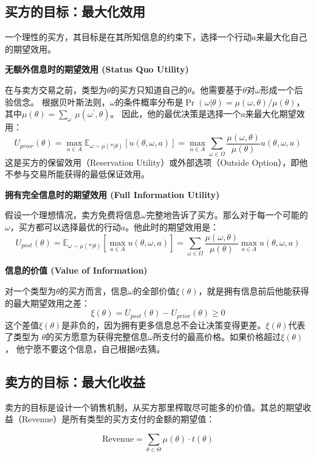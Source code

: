 \subsection{买方的目标：最大化效用}

一个理性的买方，其目标是在其所知信息的约束下，选择一个行动$a$来最大化自己的期望效用。

\textbf{无额外信息时的期望效用 (Status Quo Utility)}

在与卖方交易之前，类型为$\theta$的买方只知道自己的$\theta$。他需要基于$\theta$对$\omega$形成一个后验信念。
根据贝叶斯法则，$\omega$的条件概率分布是$\Pr(\omega | \theta) = \mu(\omega,\theta)/\mu(\theta)$，其中$\mu(\theta)=\sum\limits_{\omega^\prime} \mu(\omega^\prime, \theta)$。
因此，他的最优决策是选择一个$a$来最大化期望效用：
$$U_{prior}(\theta) = \max_{a\in A}\mathbb{E}_{\omega\sim \mu(*|\theta)}[u(\theta,\omega,a)]=\max_{a\in A}\sum\limits_{\omega\in\Omega}\frac{\mu(\omega,\theta)}{\mu(\theta)}u(\theta,\omega,a)$$
这是买方的保留效用（Reservation Utility）或外部选项（Outside Option），即他不参与交易所能获得的最低保证效用。

\textbf{拥有完全信息时的期望效用 (Full Information Utility)}

假设一个理想情况，卖方免费将信息$\omega$完整地告诉了买方。那么对于每一个可能的$\omega$，买方都可以选择最优的行动$a$。他此时的期望效用是：
$$U_{post}(\theta)=\mathbb{E}_{\omega\sim\mu(*|\theta)}[\max_{a\in A} u(\theta,\omega,a)] = \sum\limits_{\omega\in\Omega}\frac{\mu(\omega,\theta)}{\mu(\theta)}\max_{a\in A}u(\theta,\omega,a)$$

\textbf{信息的价值 (Value of Information)}

对一个类型为$\theta$的买方而言，信息$\omega$的全部价值$\xi(\theta)$，就是拥有信息前后他能获得的最大期望效用之差：
$$\xi(\theta)=U_{post}(\theta)-U_{prior}(\theta) \geq 0$$
这个差值$\xi(\theta)$是非负的，因为拥有更多信息总不会让决策变得更差。$\xi(\theta)$代表了类型为
$\theta$的买方愿意为获得完整信息$\omega$所支付的最高价格。如果价格超过$\xi(\theta)$，
他宁愿不要这个信息，自己根据$\theta$去猜。

\subsection{卖方的目标：最大化收益}

卖方的目标是设计一个销售机制，从买方那里榨取尽可能多的价值。其总的期望收益（Revenue）是所有类型的买方支付的金额的期望值：

$$\text{Revenue} = \sum\limits_{\theta\in\Theta}\mu(\theta)\cdot t(\theta)$$

